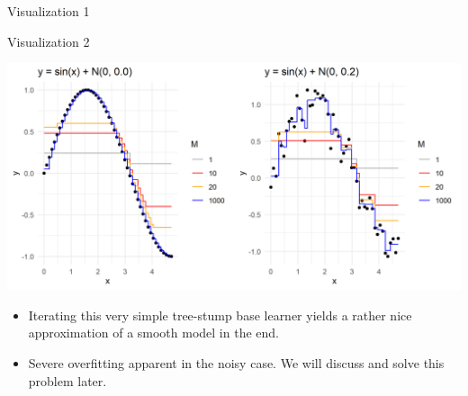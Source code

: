 \begin{frame}{Visualization 1}
\begin{center}
\end{center}

\end{frame}


\begin{vbframe}{Visualization 2}

\begin{center}
  \includegraphics[width=\textwidth]{figure/gbm_sine.png}
\end{center}

\vfill

\footnotesize
\begin{itemize}
  \item Iterating this very simple tree-stump base learner yields a rather nice
  approximation of a smooth model in the end.
  \item Severe overfitting apparent in the noisy case. We will discuss and solve 
  this problem later.
\end{itemize}

\end{vbframe}

